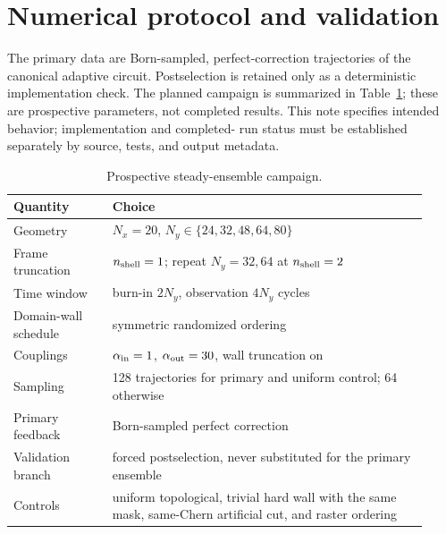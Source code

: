 \documentclass[aps,prb,onecolumn,nofootinbib,superscriptaddress]{revtex4-2}
\begin{document}
\section{Numerical protocol and validation}
\label{sec:protocol}

The primary data are Born-sampled, perfect-correction trajectories of the
canonical adaptive circuit.  Postselection is retained only as a deterministic
implementation check.  The planned campaign is summarized in
Table~\ref{tab:campaign}; these are prospective parameters, not completed
results.  This note specifies intended behavior; implementation and completed-
run status must be established separately by source, tests, and output
metadata.

\begin{table}[h]
\caption{\label{tab:campaign}Prospective steady-ensemble campaign.}
\begin{ruledtabular}
\begin{tabular}{p{0.22\linewidth}p{0.70\linewidth}}
Quantity & Choice \\
\hline
Geometry & $N_x=20$, $N_y\in\{24,32,48,64,80\}$ \\
Frame truncation & $n_{\rm shell}=1$; repeat $N_y=32,64$ at $n_{\rm shell}=2$ \\
Time window & burn-in $2N_y$, observation $4N_y$ cycles \\
Domain-wall schedule & symmetric randomized ordering \\
Couplings & $\alpha_{\rm in}=1$, $\alpha_{\rm out}=30$, wall truncation on \\
Sampling & 128 trajectories for primary and uniform control; 64 otherwise \\
Primary feedback & Born-sampled perfect correction \\
Validation branch & forced postselection, never substituted for the primary ensemble \\
Controls & uniform topological, trivial hard wall with the same mask,
same-Chern artificial cut, and raster ordering \\
\end{tabular}
\end{ruledtabular}
\end{table}
\end{document}
